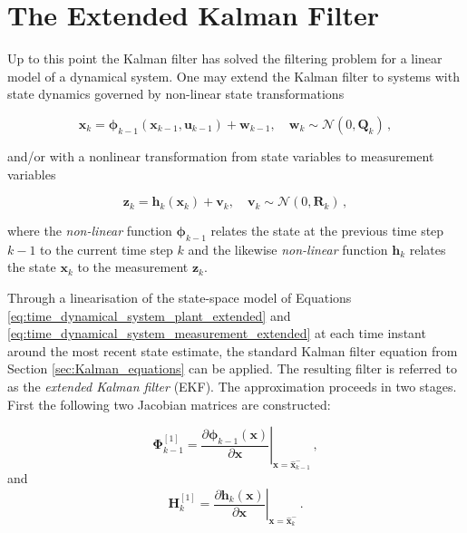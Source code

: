 \section{The Extended Kalman Filter}

Up to this point the Kalman filter has solved the filtering problem for a linear model of a dynamical system. One may extend the Kalman filter to systems with state dynamics governed by non-linear state transformations

\begin{equation}\label{eq:time_dynamical_system_plant_extended}
  \mathbf{x}_k = \bm{\phi}_{k-1}(\mathbf{x}_{k-1}, \mathbf{u}_{k-1})+\mathbf{w}_{k-1}, \quad \mathbf{w}_{k} \sim \mathcal{N}(0,\mathbf{Q}_k)\,,
\end{equation}

\noindent
and/or with a nonlinear transformation from state variables to measurement variables

\begin{equation}\label{eq:time_dynamical_system_measurement_extended}
  \mathbf{z}_k = \mathbf{h}_{k}(\mathbf{x}_{k})+\mathbf{v}_{k}, \quad \mathbf{v}_{k} \sim \mathcal{N}(0,\mathbf{R}_k)\,,
\end{equation}

\noindent
where the \emph{non-linear} function $\bm{\phi}_{k-1}$ relates the state at the previous time step $k-1$ to the current time step $k$ and the likewise \emph{non-linear} function $\mathbf{h}_{k}$ relates the state $\mathbf{x}_{k}$ to the measurement $\mathbf{z}_k$.

Through a linearisation of the state-space model of Equations \ref{eq:time_dynamical_system_plant_extended} and \ref{eq:time_dynamical_system_measurement_extended} at each time instant around the most recent state estimate, the standard Kalman filter equation from Section \ref{sec:Kalman_equations} can be applied. The resulting filter is referred to as the \emph{extended Kalman filter} (EKF). The approximation proceeds in two stages. First the following two Jacobian matrices are constructed: 

\begin{equation}\label{eq:Phi_first_order}
  \bm{\Phi}^{[1]}_{k-1} =  \left. \frac{\partial \bm{\phi}_{k-1}(\mathbf{x})}{\partial \mathbf{x}} \right|_{\mathbf{x}=\hat{\mathbf{x}}^-_{k-1}} \,,
\end{equation}
and
\begin{equation}\label{eq:Phi_first_order}
  \mathbf{H}^{[1]}_{k} = \left. \frac{\partial \mathbf{h}_{k}(\mathbf{x})}{\partial \mathbf{x}} \right|_{\mathbf{x}=\hat{\mathbf{x}}^-_{k}} \,.
\end{equation}

